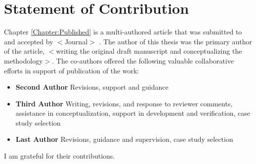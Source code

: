 \chapter{Statement of Contribution}
Chapter \ref{Chapter:Published} is a multi-authored article that was submitted to and accepted by $<$Journal$>$ \cite{MyOwnPaper}. The author of this thesis was the primary author of the article, $<$writing the original draft manuscript and conceptualizing the methodology$>$. The co-authors offered the following valuable collaborative efforts in support of publication of the work: 
\begin{itemize}
	\item \textbf{Second Author} Revisions, support and guidance
	\item \textbf{Third Author} Writing, revisions, and response to reviewer comments, assistance in conceptualization, support in development and verification, case study selection 
	\item \textbf{Last Author} Revisions, guidance and supervision, case study selection
\end{itemize}

I am grateful for their contributions.